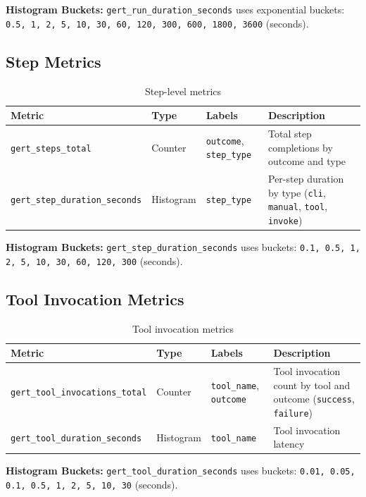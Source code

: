 \textbf{Histogram Buckets:} \texttt{gert\_run\_duration\_seconds} uses exponential buckets: \texttt{0.5, 1, 2, 5, 10, 30, 60, 120, 300, 600, 1800, 3600} (seconds).

\subsection{Step Metrics}

\begin{table}[h]
\centering
\begin{tabular}{|p{4.5cm}|p{1.5cm}|p{3.5cm}|p{5.5cm}|}
\hline
\textbf{Metric} & \textbf{Type} & \textbf{Labels} & \textbf{Description} \\
\hline
\texttt{gert\_steps\_total} & Counter & \texttt{outcome}, \texttt{step\_type} & Total step completions by outcome and type \\
\hline
\texttt{gert\_step\_duration\_seconds} & Histogram & \texttt{step\_type} & Per-step duration by type (\texttt{cli}, \texttt{manual}, \texttt{tool}, \texttt{invoke}) \\
\hline
\end{tabular}
\caption{Step-level metrics}
\end{table}

\textbf{Histogram Buckets:} \texttt{gert\_step\_duration\_seconds} uses buckets: \texttt{0.1, 0.5, 1, 2, 5, 10, 30, 60, 120, 300} (seconds).

\subsection{Tool Invocation Metrics}

\begin{table}[h]
\centering
\begin{tabular}{|p{4.5cm}|p{1.5cm}|p{3.5cm}|p{5.5cm}|}
\hline
\textbf{Metric} & \textbf{Type} & \textbf{Labels} & \textbf{Description} \\
\hline
\texttt{gert\_tool\_invocations\_total} & Counter & \texttt{tool\_name}, \texttt{outcome} & Tool invocation count by tool and outcome (\texttt{success}, \texttt{failure}) \\
\hline
\texttt{gert\_tool\_duration\_seconds} & Histogram & \texttt{tool\_name} & Tool invocation latency \\
\hline
\end{tabular}
\caption{Tool invocation metrics}
\end{table}

\textbf{Histogram Buckets:} \texttt{gert\_tool\_duration\_seconds} uses buckets: \texttt{0.01, 0.05, 0.1, 0.5, 1, 2, 5, 10, 30} (seconds).

